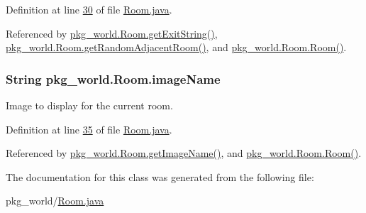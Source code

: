 Definition at line \hyperlink{Room_8java_source_l00030}{30} of file \hyperlink{Room_8java_source}{Room.\-java}.



Referenced by \hyperlink{Room_8java_source_l00215}{pkg\-\_\-world.\-Room.\-get\-Exit\-String()}, \hyperlink{Room_8java_source_l00235}{pkg\-\_\-world.\-Room.\-get\-Random\-Adjacent\-Room()}, and \hyperlink{Room_8java_source_l00062}{pkg\-\_\-world.\-Room.\-Room()}.

\hypertarget{classpkg__world_1_1Room_a5d803cae18b95d7a4fc5243fd13ae236}{
\subsubsection[{image\-Name}]{\setlength{\rightskip}{0pt plus 5cm}String pkg\-\_\-world.\-Room.\-image\-Name\hspace{0.3cm}{\ttfamily [private]}}}\label{classpkg__world_1_1Room_a5d803cae18b95d7a4fc5243fd13ae236}


Image to display for the current room. 



Definition at line \hyperlink{Room_8java_source_l00035}{35} of file \hyperlink{Room_8java_source}{Room.\-java}.



Referenced by \hyperlink{Room_8java_source_l00263}{pkg\-\_\-world.\-Room.\-get\-Image\-Name()}, and \hyperlink{Room_8java_source_l00062}{pkg\-\_\-world.\-Room.\-Room()}.



The documentation for this class was generated from the following file\-:\begin{DoxyCompactItemize}
\item 
pkg\-\_\-world/\hyperlink{Room_8java}{Room.\-java}\end{DoxyCompactItemize}
